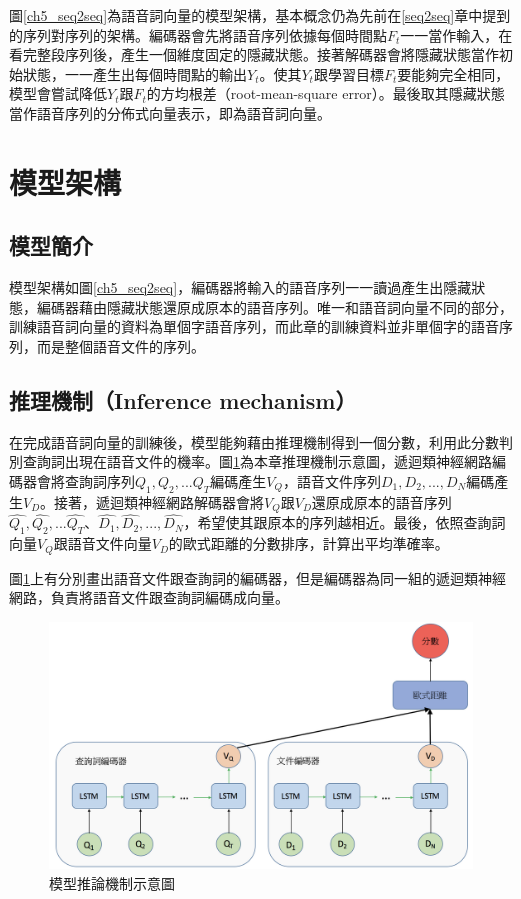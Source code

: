 圖\ref{ch5_seq2seq}為語音詞向量的模型架構，基本概念仍為先前在\ref{seq2seq}章中提到的序列對序列的架構。編碼器會先將語音序列依據每個時間點$F_t$一一當作輸入，在看完整段序列後，產生一個維度固定的隱藏狀態。接著解碼器會將隱藏狀態當作初始狀態，一一產生出每個時間點的輸出$Y_t$。使其$Y_t$跟學習目標$F_t$要能夠完全相同，模型會嘗試降低$Y_t$跟$F_t$的方均根差（root-mean-square
error）。最後取其隱藏狀態當作語音序列的分佈式向量表示，即為語音詞向量。
\section{模型架構}
\subsection{模型簡介}
模型架構如圖\ref{ch5_seq2seq}，編碼器將輸入的語音序列一一讀過產生出隱藏狀態，編碼器藉由隱藏狀態還原成原本的語音序列。唯一和語音詞向量不同的部分，訓練語音詞向量的資料為單個字語音序列，而此章的訓練資料並非單個字的語音序列，而是整個語音文件的序列。
\subsection{推理機制（Inference mechanism）}
在完成語音詞向量的訓練後，模型能夠藉由推理機制得到一個分數，利用此分數判別查詢詞出現在語音文件的機率。圖\ref{ch5_model}為本章推理機制示意圖，遞迴類神經網路編碼器會將查詢詞序列$Q_1,Q_2,...Q_T$編碼產生$V_Q$，語音文件序列$D_1,D_2,...,D_N$編碼產生$V_D$。接著，遞迴類神經網路解碼器會將$V_Q$跟$V_D$還原成原本的語音序列$\hat{Q_1},\hat{Q_2},...\hat{Q_T}$、$\hat{D_1},\hat{D_2},...,\hat{D_N}$，希望使其跟原本的序列越相近。最後，依照查詢詞向量$V_Q$跟語音文件向量$V_D$的歐式距離的分數排序，計算出平均準確率。

圖\ref{ch5_model}上有分別畫出語音文件跟查詢詞的編碼器，但是編碼器為同一組的遞迴類神經網路，負責將語音文件跟查詢詞編碼成向量。
\begin{figure}
\centering
\includegraphics[scale=0.5]{images/ch5_model.png} 
\caption{模型推論機制示意圖}
\label{ch5_model}
\end{figure}
